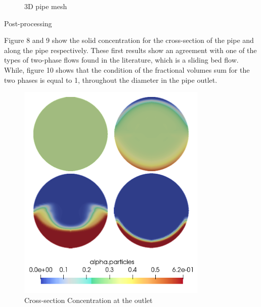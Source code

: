 \documentclass[11pt]{report}
\begin{document}
\begin{minipage}[t]{0.35\textwidth}
\begin{minipage}[t]{0.5\textwidth}
\begin{minipage}[t]{0.35\textwidth}
\begin{minipage}[t]{0.35\textwidth}
\begin{figure}[ht!]
\begin{center}
 \caption{ 3D pipe mesh}
 \label{fig:gauss}
 \end{center}
 \end{figure} 
%
 \begin{itemize}
 \bf{\item Post-processing}
 \end{itemize}
 Figure 8 and 9 show the solid concentration for the cross-section of the pipe and along the pipe respectively. 
 These first results show an agreement with one of the types of two-phase flows found in the literature, which is a sliding bed flow. 
 While, figure 10 shows that the condition of the fractional volumes sum for the two phases is equal to 1, throughout the diameter in the  pipe outlet.\\
\begin{figure}[ht!]
 \begin{center}
 
 \includegraphics[trim=0cm 0cm 0cm 0cm,clip,scale=0.7]{figs/7.png}
 \caption{ \footnotesize{Cross-section Concentration at the outlet} }
 \label{fig:gauss}
 \end{center}
 \end{figure} 
%
 \begin{figure}[ht!]
 \begin{center}


\end{center}
\end{figure}
\end{minipage}
\end{minipage}
\end{minipage}
\end{minipage}
\end{document}
